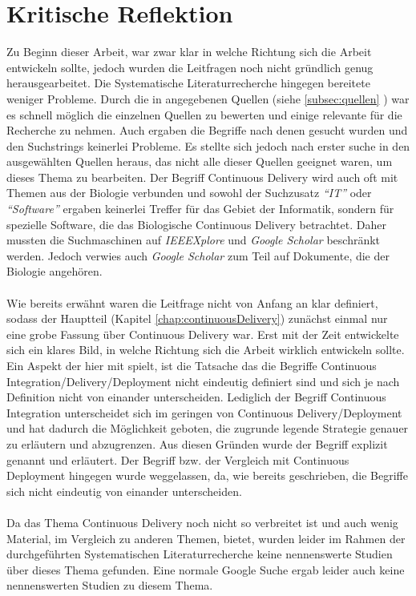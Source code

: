 \section{Kritische Reflektion}
\label{sec:kritischeRelfektion}
Zu Beginn dieser Arbeit, war zwar klar in welche Richtung sich die Arbeit entwickeln sollte, jedoch wurden die Leitfragen noch nicht gründlich genug herausgearbeitet. Die Systematische Literaturrecherche hingegen bereitete weniger Probleme. Durch die in \cite{Kitchenham2007} angegebenen Quellen (siehe \ref{subsec:quellen} ) war es schnell möglich die einzelnen Quellen zu bewerten und einige relevante für die Recherche zu nehmen. Auch ergaben die Begriffe nach denen gesucht wurden und den Suchstrings keinerlei Probleme. Es stellte sich jedoch nach erster suche in den ausgewählten Quellen heraus, das nicht alle dieser Quellen geeignet waren, um dieses Thema zu bearbeiten. Der Begriff Continuous Delivery wird auch oft mit Themen aus der Biologie verbunden und sowohl der Suchzusatz \textit{"`IT"'} oder \textit{"`Software"'} ergaben keinerlei Treffer für das Gebiet der Informatik, sondern für spezielle Software, die das Biologische Continuous Delivery betrachtet. Daher mussten die Suchmaschinen auf \textit{IEEEXplore} und \textit{Google Scholar} beschränkt werden. Jedoch verwies auch \textit{Google Scholar} zum Teil auf Dokumente, die der Biologie angehören.
\\\\
Wie bereits erwähnt waren die Leitfrage nicht von Anfang an klar definiert, sodass der Hauptteil (Kapitel \ref{chap:continuousDelivery}) zunächst einmal nur eine grobe Fassung über Continuous Delivery war. Erst mit der Zeit entwickelte sich ein klares Bild, in welche Richtung sich die Arbeit wirklich entwickeln sollte. Ein Aspekt der hier mit spielt, ist die Tatsache das die Begriffe Continuous Integration/Delivery/Deployment nicht eindeutig definiert sind und sich je nach Definition nicht von einander unterscheiden. Lediglich der Begriff Continuous Integration unterscheidet sich im geringen von Continuous Delivery/Deployment und hat dadurch die Möglichkeit geboten, die zugrunde legende Strategie genauer zu erläutern und abzugrenzen. Aus diesen Gründen wurde der Begriff explizit genannt und erläutert. Der Begriff bzw. der Vergleich mit Continuous Deployment hingegen wurde weggelassen, da, wie bereits geschrieben, die Begriffe sich nicht eindeutig von einander unterscheiden.
\\\\
Da das Thema Continuous Delivery noch nicht so verbreitet ist und auch wenig Material, im Vergleich zu anderen Themen, bietet, wurden leider im Rahmen der durchgeführten Systematischen Literaturrecherche keine nennenswerte Studien über dieses Thema gefunden. Eine normale Google Suche ergab leider auch keine nennenswerten Studien zu diesem Thema.

